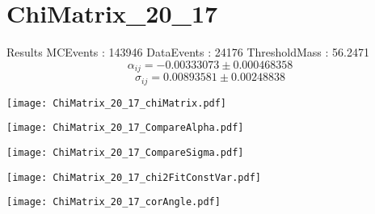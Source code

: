 \documentclass[a4paper,12pt]{article}
\begin{document}
\section{ChiMatrix\_20\_17}
\begin{minipage}{0.49\linewidth} Results \newline
MCEvents : 143946\newline
DataEvents : 24176 \newline
ThresholdMass : 56.2471\\
$$\alpha_{ij} = -0.00333073\pm 0.000468358$$
$$\sigma_{ij} = 0.00893581\pm 0.00248838$$
\end{minipage}\hfill
\begin{minipage}{0.49\linewidth} 
\texttt{[image: ChiMatrix\_20\_17\_chiMatrix.pdf]}\\
\end{minipage}
\hfill
\begin{minipage}{0.49\linewidth} 
\texttt{[image: ChiMatrix\_20\_17\_CompareAlpha.pdf]}\\
\end{minipage}
\hfill
\begin{minipage}{0.49\linewidth} 
\texttt{[image: ChiMatrix\_20\_17\_CompareSigma.pdf]}\\
\end{minipage}
\begin{minipage}{0.49\linewidth} 
\texttt{[image: ChiMatrix\_20\_17\_chi2FitConstVar.pdf]}\\
\end{minipage}
\hfill
\begin{minipage}{0.49\linewidth} 
\texttt{[image: ChiMatrix\_20\_17\_corAngle.pdf]}\\
\end{minipage}
\end{document}
